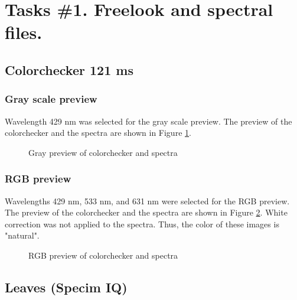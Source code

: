 \section{Tasks \#1. Freelook and spectral files.}

\subsection{Colorchecker 121 ms}

\subsubsection{Gray scale preview}
Wavelength 429 nm was selected for the gray scale preview. The preview of the colorchecker and the spectra are shown in Figure \ref{fig:cc-gray}.

\begin{figure}[H] %
  \centering
  \hspace{0.1cm}
  \caption[]{Gray preview of colorchecker and spectra }
  \label{fig:cc-gray}
\end{figure}

\subsubsection{RGB preview}
Wavelengths 429 nm, 533 nm, and 631 nm were selected for the RGB preview. The preview of the colorchecker and the spectra are shown in Figure \ref{fig:cc-rgb}. White correction was not applied to the spectra. Thus, the color of these images is "natural".

\begin{figure}[H] %
  \centering
  \hspace{0.1cm}
  \caption[]{RGB preview of colorchecker and spectra }
  \label{fig:cc-rgb}
\end{figure}

\subsection{Leaves (Specim IQ)}

